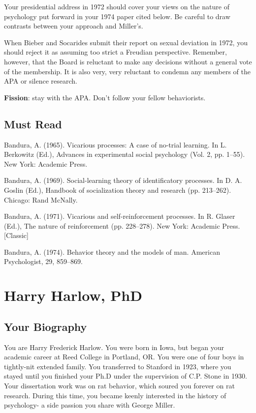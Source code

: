 \begin{refsection}
Your presidential address in 1972 should cover your views on the nature of psychology put forward in your 1974 paper cited below. Be careful to draw contrasts between your approach and Miller's.

When Bieber and Socarides submit their report on sexual deviation in 1972, you should reject it as assuming too strict a Freudian perspective. Remember, however, that the Board is reluctant to make any decisions without a general vote of the membership. It is also very, very reluctant to condemn any members of the APA or silence research.

\textbf{Fission}: stay with the APA. Don't follow your fellow behaviorists.

\section{Must Read}
\label{mustread}

Bandura, A. (1965). Vicarious processes: A case of no-trial learning. In L. Berkowitz (Ed.), Advances in experimental social psychology (Vol. 2, pp. 1--55). New York: Academic Press.

Bandura, A. (1969). Social-learning theory of identificatory processes. In D. A. Goslin (Ed.), Handbook of socialization theory and research (pp. 213--262). Chicago: Rand McNally.

Bandura, A. (1971). Vicarious and self-reinforcement processes. In R. Glaser (Ed.), The nature of reinforcement (pp. 228--278). New York: Academic Press. [Classic]

Bandura, A. (1974). Behavior theory and the models of man. American Psychologist, 29, 859--869.

\chapter{Harry Harlow, PhD}
\label{harryharlowphd}

\section{Your Biography}
\label{yourbiography}

You are Harry Frederick Harlow. You were born in Iowa, but began your academic career at Reed College in Portland, OR. You were one of four boys in tightly-nit extended family. You transferred to Stanford in 1923, where you stayed until you finished your Ph.D under the supervision of C.P. Stone in 1930. Your dissertation work was on rat behavior, which soured you forever on rat research. During this time, you became keenly interested in the history of psychology- a side passion you share with George Miller.


\end{refsection}
